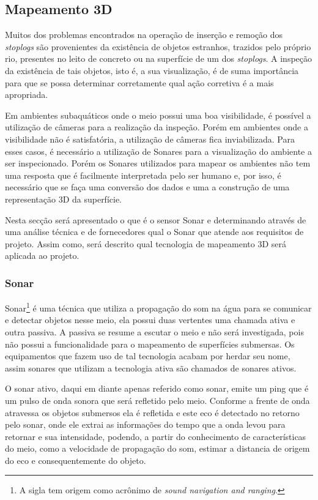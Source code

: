 \subsection{Mapeamento 3D}

Muitos dos problemas encontrados na operação de inserção e remoção dos
\textit{stoplogs} são provenientes da existência de objetos estranhos, trazidos
pelo próprio rio, presentes no leito de concreto ou na superfície de um dos
\textit{stoplogs}. A inspeção da existência de tais objetos, isto é, a sua
visualização, é de suma importância para que se possa determinar corretamente
qual ação corretiva é a mais apropriada.

Em ambientes subaquáticos onde o meio possui uma boa visibilidade, é possível a
utilização de câmeras para a realização da inspeção. Porém em ambientes onde a
visibilidade não é satisfatória, a utilização de câmeras fica inviabilizada.
Para esses casos, é necessário a utilização de Sonares para a
visualização do ambiente a ser inspecionado. Porém os Sonares utilizados para
mapear os ambientes não tem uma resposta que é facilmente interpretada pelo ser
humano e, por isso, é necessário que se faça uma conversão dos dados e uma a
construção de uma representação 3D da superfície.

Nesta secção será apresentado o que é o sensor Sonar e determinando através de uma análise técnica e de fornecedores qual o Sonar que atende aos requisitos de projeto. Assim como, será descrito qual tecnologia de mapeamento 3D será aplicada ao projeto. 



\subsubsection{Sonar}
Sonar\footnote{A sigla tem origem como acrônimo de \textit{sound navigation and ranging}.} é uma técnica que utiliza a propagação do som na água para se comunicar e detectar objetos nesse meio, ela possui duas vertentes uma chamada ativa e outra passiva. A passiva se resume a escutar o meio e não será investigada, pois não possui a funcionalidade para o mapeamento de superfícies submersas. Os equipamentos que fazem uso de tal tecnologia acabam por herdar seu nome, assim sonares que utilizam a tecnologia ativa são chamados de sonares ativos.

O sonar ativo, daqui em diante apenas referido como sonar, emite um ping que é um pulso de onda sonora que será refletido pelo meio. Conforme a frente de onda atravessa os objetos submersos ela é refletida e este eco é detectado no retorno pelo sonar, onde ele extrai as informações do tempo que a onda levou para retornar e sua intensidade, podendo, a partir do conhecimento de características do meio, como a velocidade de propagação do som, estimar a distancia de origem do eco e consequentemente do objeto.

